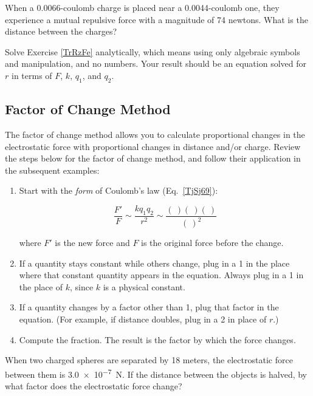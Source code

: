 \documentclass[main.tex]{subfiles}
\begin{document}
\begin{exercise} \label{bpbHHg}
    When a 0.0066-coulomb charge is placed near a 0.0044-coulomb one, they experience a mutual repulsive force with a magnitude of 74 newtons. What is the distance between the charges?
\end{exercise}


\begin{exercise} \label{DOuqpT}
    Solve Exercise \ref{TrRzFe} analytically, which means using
    only algebraic symbols and manipulation, and no numbers. Your result should be an equation solved for $r$ in terms of $F$, $k$, $q_1$, and $q_2$.
\end{exercise}
\clearpage

\subsection{Factor of Change Method} \label{MeMuHN}

The \gls{factor of change method} allows you to calculate proportional changes in the electrostatic force with proportional changes in distance and/or charge. Review the steps below for the factor of change method, and follow their application in the subsequent examples:

\begin{enumerate}
\setlength\itemsep{-1ex}
    \item Start with the \textit{form} of Coulomb's law (Eq.~\ref{TjSj69}):

    \begin{equation} \label{GQoZ3E}
        \frac{F'}{F} \sim \frac{k q_1 q_2}{r^2} \sim \frac{(\ )(\ )(\ )}{(\ )^2}
    \end{equation}

    where $F'$ is the new force and $F$ is the original force before the change.
    \item If a quantity stays constant while others change, plug in a 1 in the place where that constant quantity appears in the equation. Always plug in a 1 in the place of $k$, since $k$ is a physical constant.
    \item If a quantity changes by a factor other than 1, plug that factor in the equation. (For example, if distance doubles, plug in a 2 in place of $r$.)
    \item Compute the fraction. The result is the factor by which the force changes.
\end{enumerate}

\begin{example} \label{oKeOMF}
When two charged spheres are separated by 18 meters, the electrostatic force between them is \SI{3.0e-7}{N}. If the distance between the objects is halved, by what factor does the electrostatic force change?
\end{example}
\end{document}
